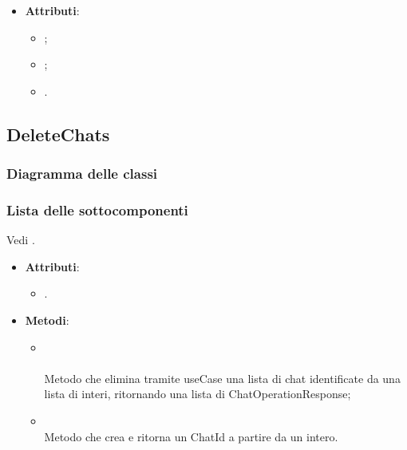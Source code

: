 \documentclass[10pt, a4paper]{article}
\begin{document}
    \label{VectorStoreDocumentOperationResponseDettaglio}
    \begin{itemize}
        \item \textbf{Attributi}:
        \begin{itemize}
            \item {};
            \item {};
            \item {}.
        \end{itemize}
    \end{itemize}
    
    
    \subsection{DeleteChats}
    \subsubsection{Diagramma delle classi}
    \subsubsection{Lista delle sottocomponenti}
    
    Vedi .
    
    \label{DeleteChatsControllerDettaglio}
    \begin{itemize}
        \item \textbf{Attributi}:
        \begin{itemize}
            \item {}.
        \end{itemize}
        \item \textbf{Metodi}:
        \begin{itemize}
            \item {}\\ \\
            Metodo che elimina tramite useCase una lista di chat identificate da una lista di interi, ritornando una lista di ChatOperationResponse;
            \item {}\\
            Metodo che crea e ritorna un ChatId a partire da un intero. 
        \end{itemize}
    \end{itemize}
    
\end{document}
